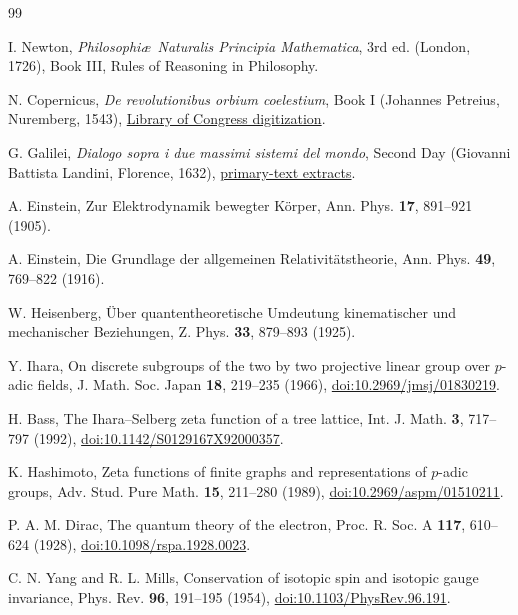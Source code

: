 \documentclass[aps,prx,reprint,longbibliography]{revtex4-2}
\begin{document}
\begin{thebibliography}{99}

I. Newton, \emph{Philosophi\ae\ Naturalis Principia Mathematica},
3rd ed. (London, 1726), Book III, Rules of Reasoning in Philosophy.

N. Copernicus, \emph{De revolutionibus orbium coelestium},
Book I (Johannes Petreius, Nuremberg, 1543),
\href{https://www.loc.gov/item/46031925/}{Library of Congress digitization}.

G. Galilei, \emph{Dialogo sopra i due massimi sistemi del mondo},
Second Day (Giovanni Battista Landini, Florence, 1632),
\href{https://mathshistory.st-andrews.ac.uk/Extras/Galileo_Dialogue/}{primary-text extracts}.

A. Einstein, Zur Elektrodynamik bewegter K\"orper,
Ann. Phys. \textbf{17}, 891--921 (1905).

A. Einstein, Die Grundlage der allgemeinen Relativit\"atstheorie,
Ann. Phys. \textbf{49}, 769--822 (1916).

W. Heisenberg, \"Uber quantentheoretische Umdeutung kinematischer und mechanischer Beziehungen,
Z. Phys. \textbf{33}, 879--893 (1925).

Y. Ihara, On discrete subgroups of the two by two projective linear group over $p$-adic fields,
J. Math. Soc. Japan \textbf{18}, 219--235 (1966),
\href{https://doi.org/10.2969/jmsj/01830219}{doi:10.2969/jmsj/01830219}.

H. Bass, The Ihara--Selberg zeta function of a tree lattice,
Int. J. Math. \textbf{3}, 717--797 (1992),
\href{https://doi.org/10.1142/S0129167X92000357}{doi:10.1142/S0129167X92000357}.

K. Hashimoto, Zeta functions of finite graphs and representations of $p$-adic groups,
Adv. Stud. Pure Math. \textbf{15}, 211--280 (1989),
\href{https://doi.org/10.2969/aspm/01510211}{doi:10.2969/aspm/01510211}.

P. A. M. Dirac, The quantum theory of the electron,
Proc. R. Soc. A \textbf{117}, 610--624 (1928),
\href{https://doi.org/10.1098/rspa.1928.0023}{doi:10.1098/rspa.1928.0023}.

C. N. Yang and R. L. Mills, Conservation of isotopic spin and isotopic gauge invariance,
Phys. Rev. \textbf{96}, 191--195 (1954),
\href{https://doi.org/10.1103/PhysRev.96.191}{doi:10.1103/PhysRev.96.191}.


\end{thebibliography}
\end{document}
